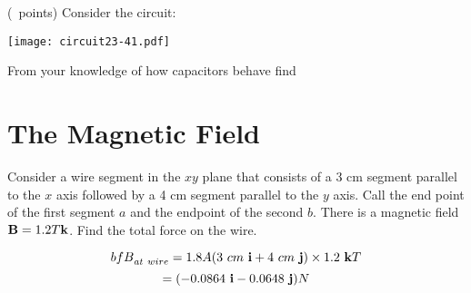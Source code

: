 \begin{questions}
\begin{parts}
\begin{solution}
    \end{solution}

  \end{parts}


  \question (\totalpoints\ points) Consider the circuit:
  
  \texttt{[image: circuit23-41.pdf]}

  From your knowledge of how capacitors behave find 

  \section{The Magnetic Field}

  \question[2] Consider a wire segment in the $xy$ plane that consists
  of a 3 cm segment parallel to the $x$ axis followed by a 4 cm
  segment parallel to the $y$ axis. Call the end point of the first
  segment $a$ and the endpoint of the second $b$. There is a magnetic
  field ${\bf B} = 1.2 T {\bf k}$. Find the total force on the wire.

  \begin{solution}
    $${bf B}_{at\ wire} = 1.8A (3\ cm\ {\bf i} + 4\ cm\ {\bf j})
    \times 1.2\ {\bf k} T$$
    $$ = (-0.0864\ {\bf i} - 0.0648\ {\bf j})N$$
  \end{solution}


\end{questions}
